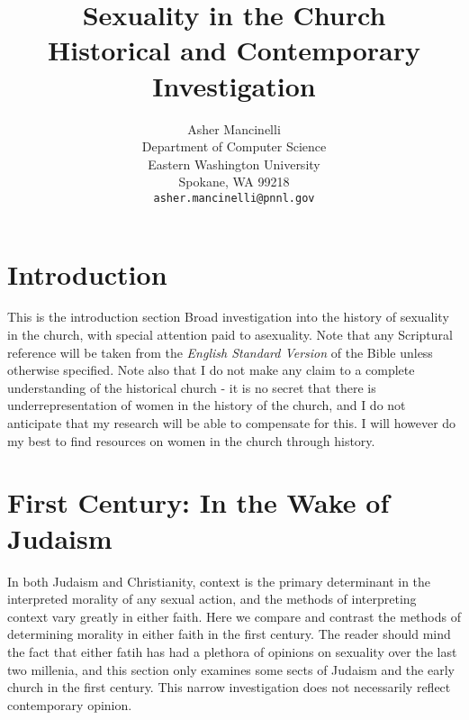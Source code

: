 \documentclass{article}
\title{
    Sexuality in the Church \\ 
    \large Historical and Contemporary Investigation}
\author{
  Asher Mancinelli \\
  Department of Computer Science\\
  Eastern Washington University\\
  Spokane, WA 99218 \\
  \texttt{asher.mancinelli@pnnl.gov} \\ }
\begin{document}
\maketitle

\begin{abstract}
\end{abstract}


\doublespace

\section{Introduction}
    This is the introduction section Broad investigation into the 
    history of sexuality in the church, with special attention paid 
    to asexuality.  Note that any Scriptural reference will be taken 
    from the \textit{English Standard Version} of the Bible unless 
    otherwise specified. Note also that I do not make any claim to a complete
    understanding of the historical church - it is no secret that there is
    underrepresentation of women in the history of the church, and I do
    not anticipate that my research will be able to compensate for this.
    I will however do my best to find resources on women in the church
    through history.

\section{First Century: In the Wake of Judaism}

    In both Judaism and Christianity, context is the primary determinant in 
    the interpreted morality of any sexual action, and the methods of 
    interpreting context vary greatly in either faith. Here we 
    compare and contrast the 
    methods of determining morality in either faith in the first century. The
    reader should mind the fact that either fatih has had a plethora 
    of opinions on sexuality over the last two millenia, and this 
    section only examines some sects of Judaism and the early church in 
    the first century. This narrow investigation does not necessarily 
    reflect contemporary opinion.
\end{document}
